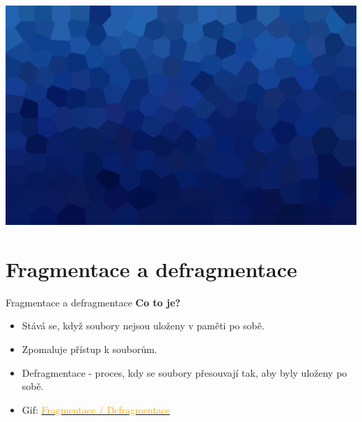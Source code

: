 \documentclass[aspectratio=169,xcolor=dvipsnames, t]{beamer}
\begin{document}
{
{
    \includegraphics[width=\paperwidth,height=\paperheight]{AICStyleData/logos/mene_polygonu_bg.png}
}
\section{Fragmentace a defragmentace}
\begin{frame}{Fragmentace a defragmentace}
\textbf{\large Co to je?}
\begin{itemize}
\item Stává se, když soubory nejsou uloženy v paměti po sobě.
\item Zpomaluje přístup k souborům.
\item Defragmentace - proces, kdy se soubory přesouvají tak, aby byly uloženy po sobě.
\item Gif: \href{https://upload.wikimedia.org/wikipedia/commons/d/d0/FragmentationDefragmentation.gif}{\textcolor{orange}{Fragmentace / Defragmentace}} 
\end{itemize}

\end{frame}
}





\makefinalpage
\end{document}
